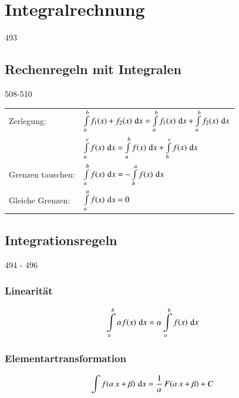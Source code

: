 \section{Integralrechnung}{493}

\subsection{Rechenregeln mit Integralen}{508-510}

\renewcommand{\arraystretch}{2.3}
\begin{tabular}{ll}
    Zerlegung:          & $\int \limits_{a}^{b} f_1(x) + f_2(x) \, \mathop{} \! \mathrm{d} x 
                        = \int \limits_{a}^{b} f_1(x) \, \mathop{} \! \mathrm{d} x + \int \limits_{a}^{b} f_2(x) \, \mathop{} \! \mathrm{d} x$                                      \\
                        & $\int \limits_{a}^{c} f(x) \, \mathop{} \! \mathrm{d} x = \int \limits_{a}^{b} f(x) \, \mathop{} \! \mathrm{d} x + \int \limits_{b}^{c} f(x) \, \mathop{} \! \mathrm{d} x$  \\
    Grenzen tauschen:   & $ \int \limits_{a}^{b} f(x) \, \mathop{} \! \mathrm{d} x = -  \int \limits_{b}^{a} f(x) \, \mathop{} \! \mathrm{d} x $                                    \\
    Gleiche Grenzen:    & $\int \limits_{a}^{a} f(x) \, \mathop{} \! \mathrm{d} x = 0$
\end{tabular}		
\renewcommand{\arraystretch}{1}


\subsection{Integrationsregeln}{494 - 496}

\vspace{-0.2cm}

\begin{minipage}[t]{0.4\columnwidth}
    \subsubsection{Linearität}

    \vspace{-0.5cm}

    \[ \int \limits_{a}^{b} \alpha f(x) \, \mathop{} \! \mathrm{d} x = \alpha \int \limits_{a}^{b} f(x) \, \mathop{} \! \mathrm{d} x \]
\end{minipage}
\hfill
\begin{minipage}[t]{0.58\columnwidth}
    \subsubsection{Elementartransformation}

    \[ \int f(\alpha \, x + \beta) \, \mathop{} \! \mathrm{d} x = \frac{1}{\alpha} \, F(\alpha \, x + \beta) + C\]
\end{minipage}


